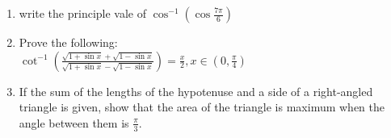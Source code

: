 \begin{enumerate}
\item 
write the principle vale of $\cos^{-1} \left(\cos\frac{7\pi}{6}\right)
$
\item Prove the following:\\

\hspace{80pt}$\cot^{-1}\left(\frac{\sqrt{1 + \sin x} + \sqrt{1 - \sin x}}{\sqrt{1 + \sin x} - \sqrt{1 - \sin x}}\right) = \frac{x}{2}, x\in  \left({0},\frac{\pi}{4}\right)$

\item 
If the sum of the lengths of the hypotenuse and a side of a right-angled triangle is given, show that the area of the triangle is maximum when the angle between them is $\frac{\pi}{3}$. 
\end{enumerate}
